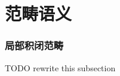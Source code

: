 \chapter{范畴语义}
\subsection{局部积闭范畴}
TODO rewrite this subsection
\begin{comment}
1984年, Seely在一篇文章~\cite{seely:1984:lccc}中
指出, 局部积闭范畴可以和依值类型论中的许多
东西找到对应. \ref{beginning:ccc}~节中已经
介绍了积闭范畴的概念, 而\emph{局部积闭范畴}
只需要进一步的定义.
\begin{definition}
给定范畴 \(\mathcal C\) 中的对象 \(A\),
定义\textbf{俯范畴}(overcategory或slice category)
\(\mathcal C_{/A}\) 的对象为所有形如
\(B \xrightarrow{f} A\) 的态射. 两个对象
\(B \xrightarrow f A\) 与 \(C \xrightarrow g A\)
之间的态射为使得 \(g \circ h = f\) 成立的 \(h\) 的集合.
\end{definition}
这里的 “局部” 指的就是在俯范畴中的构造. 可以在
集合范畴的俯范畴中获取一些直觉： 每个箭头
\(f : B \to A\) 实际上把 \(B\) 拆分成了许多子集
\(B_x = f^{-1}\{x\}\). 而俯范畴 \(\textsf{Set}_{/A}\)
中的所有构造实际上都是这些子集上逐点的构造. 比如
\(B \to A\) 与 \(C \to A\) 在俯范畴中的乘积
\(D \to A\), 满足 \(D_x = B_x \times C_x\).
因此这也称为\textbf{纤维积}, 因为这恰好是每个 \(x\)
的原像 (即 \(x\) 上的\emph{纤维}) 乘起来. 在原范畴
中, 这就是拉回.
\begin{definition}
如果某个范畴的所有俯范畴都积闭, 则称这个
范畴\textbf{局部积闭}.
\end{definition}
特别地, 这个范畴需要有所有的拉回. 如果这个范畴含有终对象
\(1\), 那么 \(\mathcal C_{/1} \cong \mathcal C\),
从而其本身是积闭的.

如果 \(f\) 是局部积闭范畴 \(\mathcal C\)
中的对象, 那么我们立即有一个函子
\[f_! : \mathcal C_{/B} \to \mathcal C_{/A}\]
描述了箭头的复合. 而由于存在所有的拉回, 有另外一个函子
\[f^* : \mathcal C_{/A} \to \mathcal C_{/B}\]
把每个箭头 (即 \(\mathcal C_{/A}\) 中的对象) 与
\(f\) 取拉回. 进一步由于存在局部的函数对象, 可以构造
第三个函子
\[f_* : \mathcal C_{/B} \to \mathcal C_{/A}.\]
事实上, 这三个函子构成伴随链\(f_!\dashv f^*\dashv f_*\).
读者可以阅读本人的一篇文章~\cite{me:2022:lccc}, 是对局部
积闭范畴, 以及其对应的伴随函子 \(f_!\dashv
f^*\dashv f_*\) 的一份比较友好的介绍. 事实上, 这三个
函子可以给出局部积闭范畴的等价定义.
\begin{theorem}
任给一个范畴, 则其中所有的态射 \(f\) 都一定有对应的
\(f_!\) 函子. 这个范畴是积闭的, 等价于
每个 \(f_!\) 函子都存在连续的两个伴随函子
\[f_!\dashv f^*\dashv f_*.\]
\end{theorem}


\end{comment}
